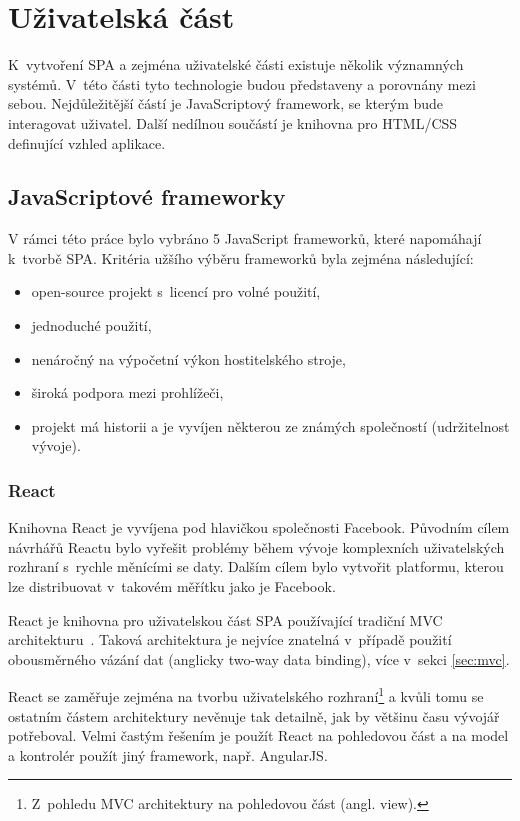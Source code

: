 \section{Uživatelská část}

K~vytvoření SPA a zejména uživatelské části existuje několik významných systémů. V~této části tyto technologie budou představeny a porovnány mezi sebou. Nejdůležitější částí je JavaScriptový framework, se kterým bude interagovat uživatel. Další nedílnou součástí je knihovna pro HTML/CSS definující vzhled aplikace.

\subsection{JavaScriptové frameworky}

V rámci této práce bylo vybráno 5 JavaScript frameworků, které napomáhají k~tvorbě SPA. Kritéria užšího výběru frameworků byla zejména následující:

\begin{itemize}  
\item open-source projekt s~licencí pro volné použití,
\item jednoduché použití,
\item nenáročný na výpočetní výkon hostitelského stroje,
\item široká podpora mezi prohlížeči,
\item projekt má historii a je vyvíjen některou ze známých společností (udržitelnost vývoje).
\end{itemize}

\subsubsection*{React~\cite{react}}
Knihovna React je vyvíjena pod hlavičkou společnosti Facebook. Původním cílem návrhářů Reactu bylo vyřešit problémy během vývoje komplexních uživatelských rozhraní s~rychle měnícími se daty. Dalším cílem bylo vytvořit platformu, kterou lze distribuovat v~takovém měřítku jako je Facebook.

React je knihovna pro uživatelskou část SPA používající tradiční MVC architekturu~\cite{mvc}. Taková architektura je nejvíce znatelná v~případě použití obousměrného vázání dat (anglicky two-way data binding), více v~sekci \ref{sec:mvc}.

React se zaměřuje zejména na tvorbu uživatelského rozhraní\footnote{Z~pohledu MVC architektury na pohledovou část (angl. view).} a kvůli tomu se ostatním částem architektury nevěnuje tak detailně, jak by většinu času vývojář potřeboval. Velmi častým řešením je použít React na pohledovou část a na model a kontrolér použít jiný framework, např. AngularJS.

